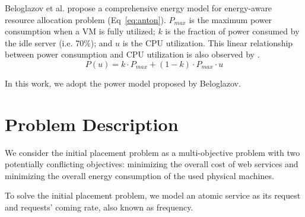 Beloglazov et al. \cite{Beloglazov:2012ji} propose a comprehensive energy model for energy-aware resource allocation problem (Eq~\ref{eq:anton}). $P_{max}$ is the maximum power consumption when a VM is fully utilized;
$k$ is the fraction of power consumed by the idle server (i.e. 70\%); and $u$ is the CPU utilization. This linear relationship between power consumption and CPU utilization is also observed by \cite{Energy_4, Energy_5}. 
\begin{equation}
\label{eq:anton}
  P(u) = k \cdot P_{max} + (1 - k) \cdot P_{max} \cdot u
\end{equation}

In this work, we adopt the power model proposed by Beloglazov.




\section{Problem Description}
\label{sec:problem}
We consider the initial placement problem as a multi-objective problem with two potentially conflicting objectives: 
minimizing the overall cost of web services and minimizing the overall energy consumption of the used physical machines. 

To solve the initial placement problem, we model an atomic service as its request and requests' coming rate, also known as frequency. 


